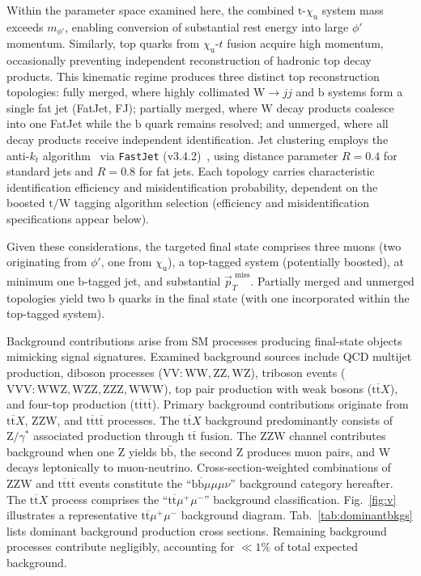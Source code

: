 Within the parameter space examined here, the combined $\mathrm{t}$-$\chi_\mathrm{u}$ system mass exceeds $m_{\phi'}$, enabling conversion of substantial rest energy into large $\phi'$ momentum. Similarly, top quarks from $\chi_\mathrm{u}$-$t$ fusion acquire high momentum, occasionally preventing independent reconstruction of hadronic top decay products. This kinematic regime produces three distinct top reconstruction topologies: fully merged, where highly collimated $\mathrm{W}\to jj$ and $\mathrm{b}$ systems form a single fat jet (FatJet, FJ); partially merged, where $\mathrm{W}$ decay products coalesce into one FatJet while the $\mathrm{b}$ quark remains resolved; and unmerged, where all decay products receive independent identification. Jet clustering employs the anti-$k_t$ algorithm~\parencite{Cacciari_2008} via \texttt{FastJet} (v3.4.2)~\parencite{Cacciari_2012}, using distance parameter $R = 0.4$ for standard jets and $R = 0.8$ for fat jets. Each topology carries characteristic identification efficiency and misidentification probability, dependent on the boosted $\mathrm{t/W}$ tagging algorithm selection (efficiency and misidentification specifications appear below). 

Given these considerations, the targeted final state comprises three muons (two originating from $\phi'$, one from $\chi_\mathrm{u}$), a top-tagged system (potentially boosted), at minimum one $\mathrm{b}$-tagged jet, and substantial $\vec{p}_{T}^{\textrm{~miss}}$. Partially merged and unmerged topologies yield two $\mathrm{b}$ quarks in the final state (with one incorporated within the top-tagged system). 

Background contributions arise from SM processes producing final-state objects mimicking signal signatures. Examined background sources include QCD multijet production, diboson processes ($\mathrm{VV: WW, ZZ, WZ}$), triboson events ($\mathrm{VVV: WWZ, WZZ, ZZZ, WWW}$), top pair production with weak bosons ($\mathrm{t}\overline{\mathrm{t}}X$), and four-top production ($\mathrm{t}\overline{\mathrm{t}}\mathrm{t}\overline{\mathrm{t}}$). Primary background contributions originate from $\mathrm{t}\overline{\mathrm{t}}X$, $\mathrm{ZZW}$, and $\mathrm{t}\overline{\mathrm{t}}\mathrm{t}\overline{\mathrm{t}}$ processes. The $\mathrm{t}\overline{\mathrm{t}}X$ background predominantly consists of $\mathrm{Z}/\gamma^{*}$ associated production through $\mathrm{t}\bar{\mathrm{t}}$ fusion. The $\mathrm{ZZW}$ channel contributes background when one $\mathrm{Z}$ yields $\mathrm{b}\bar{\mathrm{b}}$, the second $\mathrm{Z}$ produces muon pairs, and W decays leptonically to muon-neutrino.
Cross-section-weighted combinations of $\mathrm{ZZW}$ and $\mathrm{t}\overline{\mathrm{t}}\mathrm{t}\overline{\mathrm{t}}$ events constitute the ``$\mathrm{b} \overline{\mathrm{b}}\mu\mu\mu\nu$'' background category hereafter. The $\mathrm{t}\overline{\mathrm{t}}X$ process comprises the ``$\mathrm{t}\overline{\mathrm{t}}\mu^{+}\mu^{-}$'' background classification. Fig.~\ref{fig:v} illustrates a representative $\mathrm{t}\overline{\mathrm{t}}\mu^{+}\mu^{-}$ background diagram. Tab.~\ref{tab:dominantbkgs} lists dominant background production cross sections. Remaining background processes contribute negligibly, accounting for $\ll 1\%$ of total expected background.

